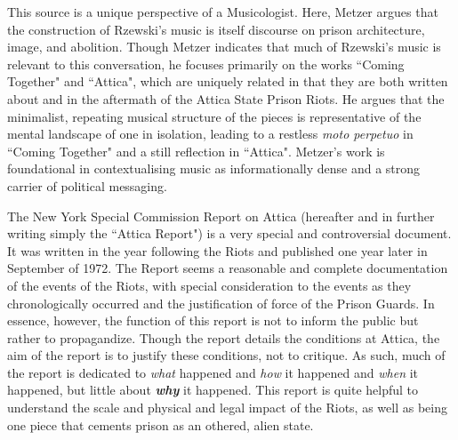 \documentclass[14pt, letterpaper]{article}
\begin{document}
\begin{adjustwidth}{2ex}{0pt}

  This source is a unique perspective of a Musicologist. Here, Metzer 
  argues that the construction of Rzewski's music is itself discourse 
  on prison architecture, image, and abolition. Though Metzer indicates 
  that much of Rzewski's music is relevant to this conversation, he 
  focuses primarily on the works ``Coming Together" and ``Attica", which 
  are uniquely related in that they are both written about and in the 
  aftermath of the Attica State Prison Riots. He argues that the minimalist, 
  repeating musical structure of the pieces is representative of the mental 
  landscape of one in isolation, leading to a restless \textit{moto perpetuo}
  in ``Coming Together" and a still reflection in ``Attica". Metzer's work 
  is foundational in contextualising music as informationally dense and 
  a strong carrier of political messaging. 
  
\end{adjustwidth}

\clearpage


\begin{adjustwidth}{2.5ex}{0pt}

  The New York Special Commission Report on Attica (hereafter and in 
  further writing simply the ``Attica Report") is a very special and 
  controversial document. It was written in the year following the 
  Riots and published one year later in September of 1972. The Report 
  seems a reasonable and complete documentation of the events of the 
  Riots, with special consideration to the events as they chronologically 
  occurred and the justification of force of the Prison Guards. In 
  essence, however, the function of this report is not to inform the 
  public but rather to propagandize. Though the report details 
  the conditions at Attica, the aim of the report is to justify these 
  conditions, not to critique. As such, much of the report is dedicated 
  to \textit{what} happened and \textit{how} it happened and 
  \textit{when} it happened, but little about \textit{\textbf{why}} 
  it happened. This report is quite helpful to understand the scale 
  and physical and legal impact of the Riots, as well as being one 
  piece that cements prison as an othered, alien state. 

\end{adjustwidth}

\clearpage
\end{document}
